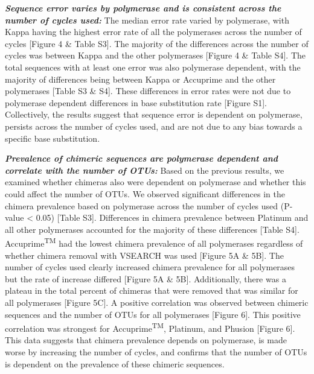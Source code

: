 \documentclass[11pt,]{article}
\begin{document}
\textbf{\emph{Sequence error varies by polymerase and is consistent
across the number of cycles used:}} The median error rate varied by
polymerase, with Kappa having the highest error rate of all the
polymerases across the number of cycles {[}Figure 4 \& Table S3{]}. The
majority of the differences across the number of cycles was between
Kappa and the other polymerases {[}Figure 4 \& Table S4{]}. The total
sequences with at least one error was also polymerase dependent, with
the majority of differences being between Kappa or Accuprime and the
other polymerases {[}Table S3 \& S4{]}. These differences in error rates
were not due to polymerase dependent differences in base substitution
rate {[}Figure S1{]}. Collectively, the results suggest that sequence
error is dependent on polymerase, persists across the number of cycles
used, and are not due to any bias towards a specific base substitution.

\textbf{\emph{Prevalence of chimeric sequences are polymerase dependent
and correlate with the number of OTUs:}} Based on the previous results,
we examined whether chimeras also were dependent on polymerase and
whether this could affect the number of OTUs. We observed significant
differences in the chimera prevalence based on polymerase across the
number of cycles used (P-value \textless{} 0.05) {[}Table S3{]}.
Differences in chimera prevalence between Platinum and all other
polymerases accounted for the majority of these differences {[}Table
S4{]}. Accuprime\textsuperscript{TM} had the lowest chimera prevalence
of all polymerases regardless of whether chimera removal with VSEARCH
was used {[}Figure 5A \& 5B{]}. The number of cycles used clearly
increased chimera prevalence for all polymerases but the rate of
increase differed {[}Figure 5A \& 5B{]}. Additionally, there was a
plateau in the total percent of chimeras that were removed that was
similar for all polymerases {[}Figure 5C{]}. A positive correlation was
observed between chimeric sequences and the number of OTUs for all
polymerases {[}Figure 6{]}. This positive correlation was strongest for
Accuprime\textsuperscript{TM}, Platinum, and Phusion {[}Figure 6{]}.
This data suggests that chimera prevalence depends on polymerase, is
made worse by increasing the number of cycles, and confirms that the
number of OTUs is dependent on the prevalence of these chimeric
sequences.
\end{document}
